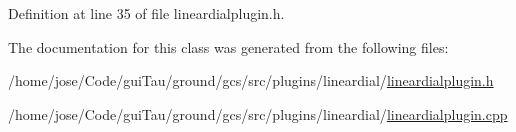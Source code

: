 Definition at line 35 of file lineardialplugin.\-h.



The documentation for this class was generated from the following files\-:\begin{DoxyCompactItemize}
\item 
/home/jose/\-Code/gui\-Tau/ground/gcs/src/plugins/lineardial/\hyperlink{lineardialplugin_8h}{lineardialplugin.\-h}\item 
/home/jose/\-Code/gui\-Tau/ground/gcs/src/plugins/lineardial/\hyperlink{lineardialplugin_8cpp}{lineardialplugin.\-cpp}\end{DoxyCompactItemize}
